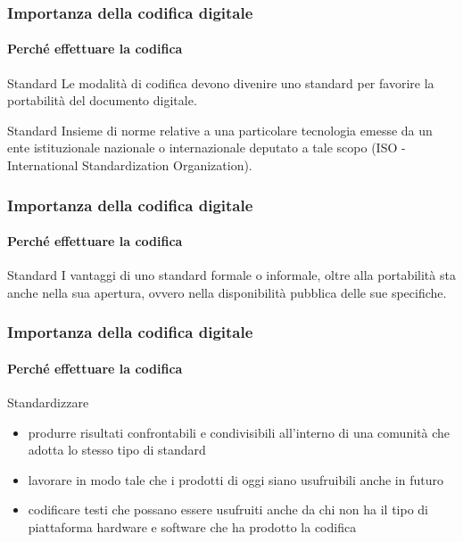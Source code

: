\begin{frame}
	\frametitle{Importanza della codifica digitale}
	\framesubtitle{Perché effettuare la codifica}
	\addtocounter{nframe}{1}

	\begin{block}{Standard}
		Le modalità di codifica devono divenire uno standard per favorire la portabilità del documento digitale.
	\end{block}

	\begin{block}{Standard}
		Insieme di norme relative a una particolare tecnologia emesse da un ente istituzionale nazionale o internazionale deputato a tale scopo (ISO - International Standardization Organization).
	\end{block}
\end{frame}


\begin{frame}
	\frametitle{Importanza della codifica digitale}
	\framesubtitle{Perché effettuare la codifica}
	\addtocounter{nframe}{1}

	\begin{block}{Standard}
		I vantaggi di uno standard formale o informale, oltre alla portabilità sta anche nella sua apertura, ovvero nella disponibilità pubblica delle sue specifiche.
	\end{block}

\end{frame}


\begin{frame}
	\frametitle{Importanza della codifica digitale}
	\framesubtitle{Perché effettuare la codifica}
	\addtocounter{nframe}{1}

	\begin{block}{Standardizzare}

		\begin{itemize}
			\item produrre risultati confrontabili e condivisibili all’interno di
			una comunità che adotta lo stesso tipo di standard
			\item lavorare in modo tale che i prodotti di oggi siano
			usufruibili anche in futuro
			\item codificare testi che possano essere usufruiti anche da chi
			non ha il tipo di piattaforma hardware e software che ha
			prodotto la codifica
		\end{itemize}
		 
	\end{block}

\end{frame}


